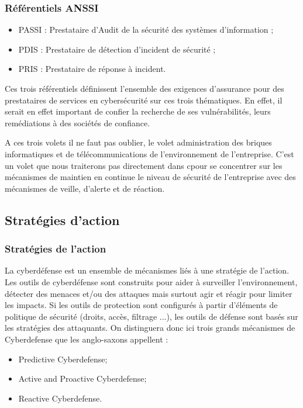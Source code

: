 \begin{frame}
\frametitle<presentation>{Référentiels ANSSI}
\begin{itemize}
\item PASSI : Prestataire d’Audit de la sécurité des systèmes d’information ;
\item PDIS : Prestataire de détection d’incident de sécurité ;
\item PRIS : Prestataire de réponse à incident.
\end{itemize}

Ces trois référentiels définissent l’ensemble des exigences d’assurance pour des prestataires de services en cybersécurité sur ces trois thématiques. En effet, il serait en effet important de confier la recherche de ses vulnérabilités, leurs remédiations à des sociétés de confiance. 
\end{frame}
A ces trois volets il ne faut pas oublier, le volet administration des briques informatiques et de télécommunications de l’environnement de l’entreprise. C’est un volet que nous traiterons pas directement dans c\edoc pour se concentrer sur les mécanismes de maintien en continue le niveau de sécurité de l’entreprise avec des mécanismes de veille, d’alerte et de réaction.


\subsection{Stratégies d'action}


\begin{frame}
\frametitle<presentation>{Stratégies de l'action}

La cyberdéfense est un ensemble de mécanismes liés à une stratégie de l'action. Les outils de cyberdéfense sont construits pour aider à surveiller l'environnement, détecter des menaces et/ou des attaques mais surtout agir et réagir pour limiter les impacts. Si les outils de protection sont configurés à partir d'éléments de politique de sécurité (droits, accès, filtrage ...), les outils de défense sont basés sur les stratégies des attaquants.
On distinguera donc ici trois grands mécanismes de Cyberdefense que les anglo-saxons appellent : 

\begin{itemize}
	\item Predictive Cyberdefense;
	\item Active and Proactive Cyberdefense;
	\item Reactive Cyberdefense.
\end{itemize}
\end{frame}

